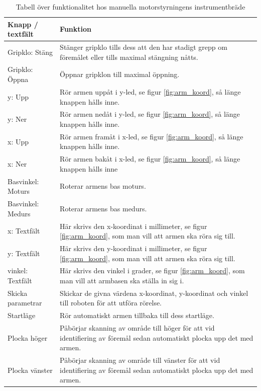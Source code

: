\documentclass[a4paper,12pt]{article}
\begin{document}
\begin{table}[H]
    \centering
    \begin{tabularx}{\textwidth}{|l|X|}
        \hline \textbf{Knapp / textfält} & \textbf{Funktion} \\ \hline
        Gripklo: Stäng& Stänger gripklo tills dess att den har stadigt grepp om föremålet eller tills maximal stängning nåtts. \\ \hline
        Gripklo: Öppna& Öppnar gripklon till maximal öppning. \\ \hline
        y: Upp & Rör armen uppåt i y-led, se figur \ref{fig:arm_koord}, så länge knappen hålls inne. \\ \hline
        y: Ner & Rör armen nedåt i y-led, se figur \ref{fig:arm_koord}, så länge knappen hålls inne. \\ \hline
        x: Upp & Rör armen framåt i x-led, se figur \ref{fig:arm_koord}, så länge knappen hålls inne. \\ \hline
        x: Ner & Rör armen bakåt i x-led, se figur \ref{fig:arm_koord}, så länge knappen hålls inne \\ \hline
        Basvinkel: Moturs & Roterar armens bas moturs. \\ \hline
        Basvinkel: Medurs & Roterar armens bas medurs. \\ \hline
        x: Textfält & Här skrivs den x-koordinat i millimeter, se figur \ref{fig:arm_koord}, som man vill att armen ska röra sig till. \\ \hline
        y: Textfält & Här skrivs den y-koordinat i millimeter, se figur \ref{fig:arm_koord}, som man vill att armen ska röra sig till. \\ \hline
        vinkel: Textfält & Här skrivs den vinkel i grader, se figur \ref{fig:arm_koord}, som man vill att armbasen ska ställa in sig i. \\ \hline
        Skicka parametrar & Skickar de givna värdena x-koordinat, y-koordinat och vinkel till roboten för att utföra rörelse. \\ \hline
        Startläge & Rör automatiskt armen tillbaka till dess startläge. \\ \hline
        Plocka höger & Påbörjar skanning av område till höger för att vid identifiering av föremål sedan automatiskt plocka upp det med armen. \\ \hline
        Plocka vänster & Påbörjar skanning av område till vänster för att vid identifiering av föremål sedan automatiskt plocka upp det med armen. \\ \hline
    \end{tabularx}
\caption{Tabell över funktionalitet hos manuella motorstyrningens instrumentbräde}
\label{tab:arm}
\end{table}
\end{document}

